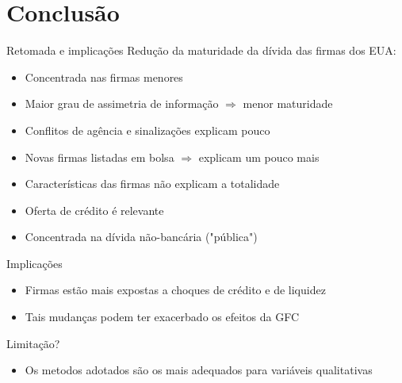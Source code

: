 \documentclass[presentation]{beamer}
\begin{document}
\section{Conclusão}
\label{sec:orgd4dbafa}
\begin{frame}[label={sec:org999dfa2}]{Retomada e implicações}
Redução da maturidade da dívida das firmas dos EUA:
\begin{itemize}
\item Concentrada nas firmas menores
\item Maior grau de assimetria de informação \(\Rightarrow\) menor maturidade
\item Conflitos de agência e sinalizações explicam pouco
\item Novas firmas listadas em bolsa \(\Rightarrow\) explicam um pouco mais
\item Características das firmas não explicam a totalidade
\item Oferta de crédito é relevante
\item Concentrada na dívida não-bancária ("pública")
\end{itemize}

\begin{block}{Implicações}
\begin{itemize}
\item Firmas estão mais expostas a choques de crédito e de liquidez
\item Tais mudanças podem ter exacerbado os efeitos da GFC
\end{itemize}
\end{block}

\begin{block}{Limitação?}
\begin{itemize}
\item Os metodos adotados são os mais adequados para variáveis qualitativas
\end{itemize}
\end{block}
\end{frame}
\end{document}
